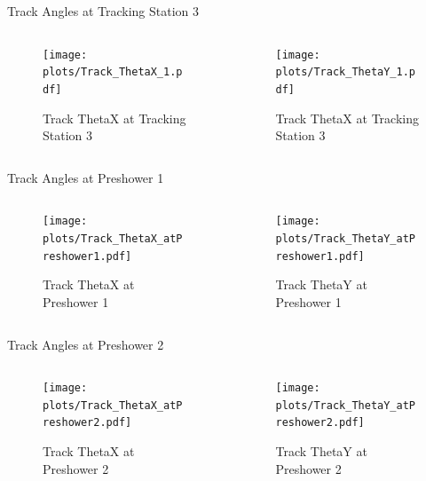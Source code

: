 \begin{frame}{Track Angles at Tracking Station 3}
	\begin{columns}
		\begin{column}{0.5\textwidth}
			\begin{figure}
				\texttt{[image: \\plots/Track\_ThetaX\_1.pdf]}
				\caption{Track ThetaX at Tracking Station 3}
			\end{figure}
		\end{column}
		\begin{column}{0.5\textwidth}
			\begin{figure}
				\texttt{[image: \\plots/Track\_ThetaY\_1.pdf]}
				\caption{Track ThetaX at Tracking Station 3}
			\end{figure}
		\end{column}
	\end{columns}
\end{frame}

\begin{subframe}{Track Angles at Preshower 1 }
	\begin{columns}
		\begin{column}{0.5\textwidth}
			\begin{figure}
				\texttt{[image: \\plots/Track\_ThetaX\_atPreshower1.pdf]}
				\caption{Track ThetaX at Preshower 1}
			\end{figure}
		\end{column}
		\begin{column}{0.5\textwidth}
			\begin{figure}
				\texttt{[image: \\plots/Track\_ThetaY\_atPreshower1.pdf]}
				\caption{Track ThetaY at Preshower 1}
			\end{figure}
		\end{column}
	\end{columns}
\end{subframe}

\begin{subframe}{Track Angles at Preshower 2 }
	\begin{columns}
		\begin{column}{0.5\textwidth}
			\begin{figure}
				\texttt{[image: \\plots/Track\_ThetaX\_atPreshower2.pdf]}
				\caption{Track ThetaX at Preshower 2}
			\end{figure}
		\end{column}
		\begin{column}{0.5\textwidth}
			\begin{figure}
				\texttt{[image: \\plots/Track\_ThetaY\_atPreshower2.pdf]}
				\caption{Track ThetaY at Preshower 2}
			\end{figure}
		\end{column}
	\end{columns}
\end{subframe}

